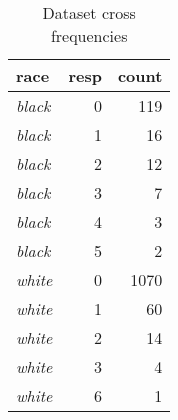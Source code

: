 \begin{wraptable}{r}{1.5in}

\caption{\label{tab:dataset_crosscount}Dataset cross frequencies}
\centering
\fontsize{9}{11}\selectfont
\begin{tabular}[t]{>{}lrr}
\toprule
race & resp & count\\
\midrule
\em{black} & 0 & 119\\
\em{black} & 1 & 16\\
\em{black} & 2 & 12\\
\em{black} & 3 & 7\\
\em{black} & 4 & 3\\
\addlinespace
\em{black} & 5 & 2\\
\em{white} & 0 & 1070\\
\em{white} & 1 & 60\\
\em{white} & 2 & 14\\
\em{white} & 3 & 4\\
\addlinespace
\em{white} & 6 & 1\\
\bottomrule
\end{tabular}
\end{wraptable}
